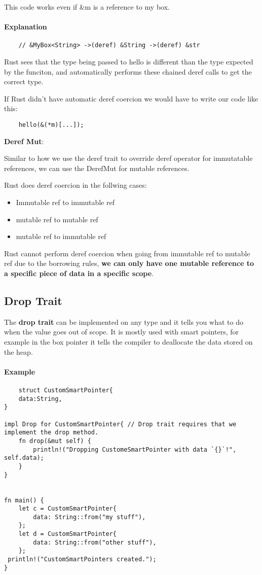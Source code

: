 This code works even if \&m is a reference to my box.

\paragraph*{Explanation}\begin{lstlisting}
    // &MyBox<String> ->(deref) &String ->(deref) &str
\end{lstlisting}
Rust sees that the type being passed to hello is different than the type expected by the funciton, and automatically performs these chained deref calls to get the correct type.

If Rust didn't have automatic deref coercion we would have to write our code like this:\begin{lstlisting}
    hello(&(*m)[...]);
\end{lstlisting}

\begin{definition}\textbf{Deref Mut}:

Similar to how we use the deref trait to override deref operator for immutatable references, we can use the DerefMut for mutable references.
\end{definition}

Rust does deref coercion in the follwing cases:\begin{itemize}
    \item Immutable ref to immutable ref
    \item mutable ref to mutable ref
    \item mutable ref to immutable ref
\end{itemize}

Rust cannot perform deref coercion when going from immutable ref to mutable ref due to the borrowing rules, \textbf{we can only have one mutable reference to a specific piece of data in a specific scope}.
\subsection{Drop Trait}
\begin{definition}
    The \textbf{drop trait} can be implemented on any type and it tells you what to do when the value goes out of scope. It is mostly used with smart pointers, for example in the box pointer it tells the compiler to deallocate the data stored on the heap.
\end{definition}

\paragraph*{Example}\begin{lstlisting}
    struct CustomSmartPointer{
    data:String,
}

impl Drop for CustomSmartPointer{ // Drop trait requires that we implement the drop method.
    fn drop(&mut self) {
        println!("Dropping CustomeSmartPointer with data `{}`!", self.data);
    }
}


fn main() {
    let c = CustomSmartPointer{
        data: String::from("my stuff"),
    };
    let d = CustomSmartPointer{
        data: String::from("other stuff"),
    };
 println!("CustomSmartPointers created.");
}
\end{lstlisting}
